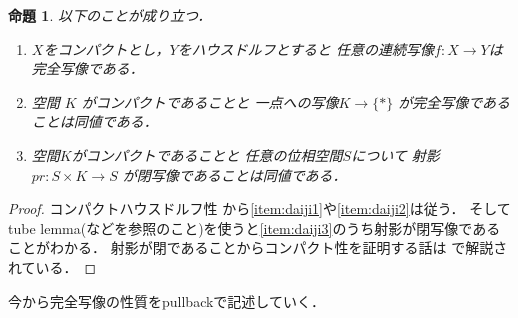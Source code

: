\documentclass[leqno, a4paper, 12pt, dvipdfmx]{jsarticle}
\newtheorem{prop}[thm]{命題}
\begin{document}
\begin{prop}\label{prop:compper}
以下のことが成り立つ．

\begin{enumerate}[label=\textup{(K\arabic*)}]
\item\label{item:daiji1} 
$X$をコンパクトとし，$Y$をハウスドルフとすると
任意の連続写像$f\colon X\to Y$は完全写像である．


\item\label{item:daiji2}
空間
$K$
がコンパクトであることと
一点への写像$K\to \{*\}$
が完全写像であることは同値である．
\item\label{item:daiji3}
空間$K$がコンパクトであることと
任意の位相空間$S$について
射影$pr\colon S\times K\to S$
が閉写像であることは同値である．


\end{enumerate}
\end{prop}
\begin{proof}
コンパクトハウスドルフ性
から\ref{item:daiji1}や\ref{item:daiji2}は従う．
そしてtube lemma(\cite{dempa1}などを参照のこと)を使うと\ref{item:daiji3}のうち射影が閉写像であることがわかる．
射影が閉であることからコンパクト性を証明する話は
\cite{dempa2}で解説されている．
\end{proof}


今から完全写像の性質をpullbackで記述していく．
\end{document}

